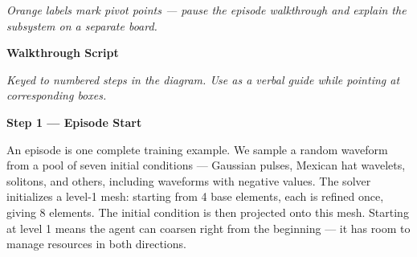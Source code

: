 \documentclass[11pt]{article}
\begin{document}
\begin{center}
\end{center}

\vspace{0.2cm}
\begin{center}
\small\textit{Orange labels mark pivot points --- pause the episode walkthrough and explain the subsystem on a separate board.}
\end{center}

\newpage

\begin{center}
{\Large\bfseries Walkthrough Script}
\end{center}

\vspace{0.2cm}

\noindent\textit{Keyed to numbered steps in the diagram. Use as a verbal guide while pointing at corresponding boxes.}

\vspace{0.4cm}

\noindent\textbf{\textcolor{episodecolor}{Step 1 --- Episode Start}}

An episode is one complete training example. We sample a random waveform from a pool of seven initial conditions --- Gaussian pulses, Mexican hat wavelets, solitons, and others, including waveforms with negative values. The solver initializes a level-1 mesh: starting from 4 base elements, each is refined once, giving 8 elements. The initial condition is then projected onto this mesh. Starting at level 1 means the agent can coarsen right from the beginning --- it has room to manage resources in both directions.
\end{document}
